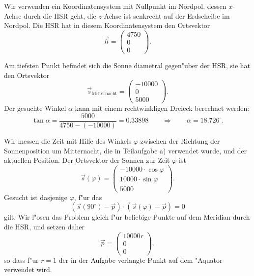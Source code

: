 \begin{loesung}
Wir verwenden ein Koordinatensystem mit Nullpunkt im Nordpol,
dessen $x$-Achse durch die HSR geht, die $z$-Achse ist senkrecht
auf der Erdscheibe im Nordpol.
Die HSR hat in diesem Koordinatensystem den Ortsvektor
\[
\vec h=\begin{pmatrix}4750\\0\\0\end{pmatrix}.
\]
\begin{teilaufgaben}
\item
Am tiefsten Punkt befindet sich die Sonne diametral gegen"uber der HSR,
sie hat den Ortsvektor
\[
\vec s_{\text{Mitternacht}}=\begin{pmatrix}-10000\\0\\5000\end{pmatrix}.
\]
Der gesuchte Winkel $\alpha$ kann mit einem rechtwinkligen Dreieck berechnet
werden:
\[
\tan\alpha = \frac{5000}{4750-(-10000)}=0.33898
\qquad\Rightarrow\qquad
\alpha=18.726^\circ.
\]
\item
Wir messen die Zeit mit Hilfe des Winkels $\varphi$ zwischen der Richtung
der Sonnenposition um Mitternacht, die in Teilaufgabe a) verwendet wurde,
und der aktuellen Position.
Der Ortsvektor der Sonnen zur Zeit $\varphi$ ist
\[
\vec{s}(\varphi) =
\begin{pmatrix}
-10000\cdot\cos\varphi\\
10000\cdot\sin\varphi\\
5000
\end{pmatrix}.
\]
Gesucht ist dasjenige $\varphi$, f"ur das 
\[
(\vec s(90^\circ) - \vec p)\cdot(\vec s(\varphi)-\vec p)=0
\]
gilt.
Wir l"osen das Problem gleich f"ur beliebige Punkte auf dem Meridian
durch die HSR, und setzen daher 
\[
\vec p=\begin{pmatrix}10000r\\0\\0\end{pmatrix},
\]
so dass f"ur $r=1$ der in der Aufgabe verlangte Punkt auf dem "Aquator
verwendet wird.


\end{teilaufgaben}
\end{loesung}
